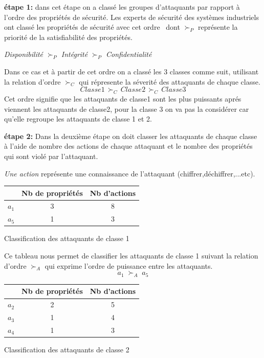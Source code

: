 \documentclass[10pt,a4paper]{article}
\begin{document}
\textbf{étape 1:}\newline
dans cet étape on a classé les groupes d'attaquants par rapport à l'ordre des propriétés de sécurité. Les experts de sécurité des systèmes industriels ont classé les propriétés de sécurité avec cet ordre~\cite{ref9} dont ${\succ}_{P}$ représente la priorité de la satisfiabilité des propriétés.
\begin{center}
\textit{Disponibilit\'{e} ${\succ}_{P}$ Int\'{e}grit\'{e} ${\succ}_{P}$ Confidentialit\'{e}}
\end{center}
Dans ce cas et à partir de cet ordre on a classé les 3 classes comme suit, utilisant la relation d'ordre ${\succ}_{C}$ qui répresente la séverité des attaquants de chaque classe.
\[Classe 1\, {\succ}_{C}\, Classe 2\, {\succ}_{C}\, Classe 3\]
Cet ordre signifie que les attaquants de classe1 sont les plus puissants aprés viennent les attaquants de classe2, pour la classe 3 on va pas la considérer car qu'elle regroupe les attaquants de classe 1 et 2.\newline
  
\textbf{étape 2:}\newline
Dans la deuxième étape on doit classer les attaquants de chaque classe à l'aide de nombre des actions de chaque attaquant et le nombre des propriétés qui sont violé par l'attaquant. 
\medskip

\textit{Une action} représente une connaissance de l'attaquant (chiffrer,déchiffrer,...etc).

\begin{table}[!h]
\centering
\begin{tabular}{c|c|c|}
\cline{2-3}
&Nb de propriétés  &Nb d'actions  \\ \hline
\multicolumn{1}{|c|}{$a_1$} &3  & 8 \\ \hline
\multicolumn{1}{|c|}{$a_5$} &1  & 3 \\ \hline
\end{tabular}
\end{table}
\caption{Classification des attaquants de classe 1}
\medskip

Ce tableau nous permet de classifier les attaquants de classe 1 suivant la relation d'ordre ${\succ}_{A}$ qui exprime l'ordre de puissance entre les attaquants. 
\[a_1\; {\succ}_{A}\; a_5\]
\begin{table}[!h]
\centering
\begin{tabular}{c|c|c|}
\cline{2-3}
&Nb de propriétés  &Nb d'actions  \\ \hline
\multicolumn{1}{|c|}{$a_2$} &2  & 5 \\ \hline
\multicolumn{1}{|c|}{$a_3$} &1  & 4 \\ \hline
\multicolumn{1}{|c|}{$a_4$} &1  & 3 \\ \hline
\end{tabular}
\end{table}
\caption{Classification des attaquants de classe 2}
\medskip
\end{document}
